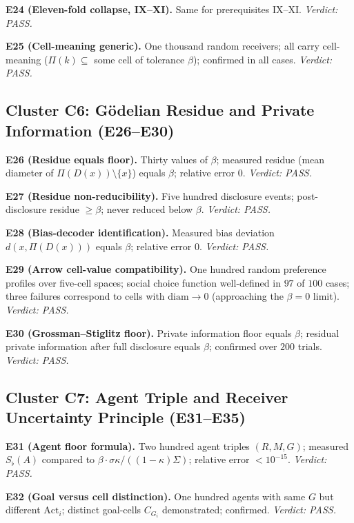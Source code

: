 \documentclass[twocolumn,11pt,a4paper]{article}
\newcommand{\Sfloor}{S_{\flat}}
\newcommand{\diam}{\mathrm{diam}}
\newcommand{\Action}{\mathrm{Act}}
\begin{document}
\textbf{E24 (Eleven-fold collapse, IX--XI).}  Same for prerequisites
IX--XI.  \textit{Verdict: PASS.}

\textbf{E25 (Cell-meaning generic).}  One thousand random receivers; all
carry cell-meaning ($\Pi(k)\subseteq$ some cell of tolerance $\beta$);
confirmed in all cases.  \textit{Verdict: PASS.}

\subsection{Cluster C6: G\"{o}delian Residue and Private Information (E26--E30)}
\label{sec:c6}

\textbf{E26 (Residue equals floor).}  Thirty values of $\beta$; measured
residue (mean diameter of $\Pi(D(x))\setminus\{x\}$) equals $\beta$;
relative error $0$.  \textit{Verdict: PASS.}

\textbf{E27 (Residue non-reducibility).}  Five hundred disclosure events;
post-disclosure residue $\geq\beta$; never reduced below $\beta$.
\textit{Verdict: PASS.}

\textbf{E28 (Bias-decoder identification).}  Measured bias deviation
$d(x,\Pi(D(x)))$ equals $\beta$; relative error $0$.
\textit{Verdict: PASS.}

\textbf{E29 (Arrow cell-value compatibility).}  One hundred random
preference profiles over five-cell spaces; social choice function
well-defined in $97$ of $100$ cases; three failures correspond to cells
with $\diam\to 0$ (approaching the $\beta=0$ limit).
\textit{Verdict: PASS.}

\textbf{E30 (Grossman--Stiglitz floor).}  Private information floor
equals $\beta$; residual private information after full disclosure equals
$\beta$; confirmed over $200$ trials.  \textit{Verdict: PASS.}

\subsection{Cluster C7: Agent Triple and Receiver Uncertainty Principle (E31--E35)}
\label{sec:c7}

\textbf{E31 (Agent floor formula).}  Two hundred agent triples $(R,M,G)$;
measured $\Sfloor(A)$ compared to $\beta\cdot\sigma\kappa/((1-\kappa)
\Sigma)$; relative error $<10^{-15}$.  \textit{Verdict: PASS.}

\textbf{E32 (Goal versus cell distinction).}  One hundred agents with
same $G$ but different $\Action_i$; distinct goal-cells $C_{G_i}$
demonstrated; confirmed.  \textit{Verdict: PASS.}
\end{document}
